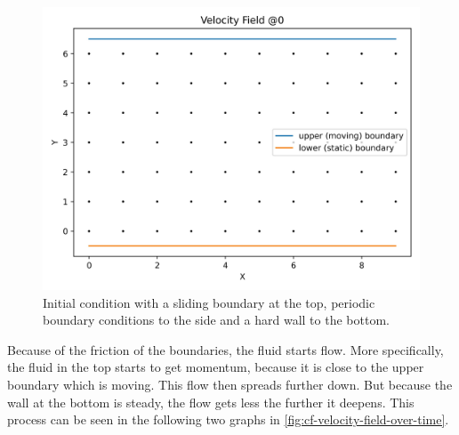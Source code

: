\begin{figure}[H]
    \begin{center}
        \includegraphics[width=0.5\linewidth]{graphs/CouetteFlow/velocity_field_couette_flow_0}
        \caption{Initial condition with a sliding boundary at the top, periodic boundary conditions to the side and a hard wall to the bottom.}
        \label{fig:cf-initial-condition}
    \end{center}
\end{figure}

Because of the friction of the boundaries, the fluid starts flow.
More specifically, the fluid in the top starts to get momentum, because it is close to the upper boundary which is moving.
This flow then spreads further down.
But because the wall at the bottom is steady, the flow gets less the further it deepens.
This process can be seen in the following two graphs in \cref{fig:cf-velocity-field-over-time}.


